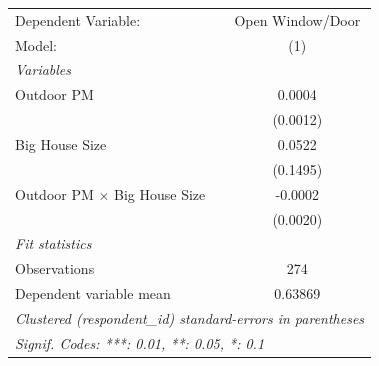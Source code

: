 
\begingroup
\centering
\begin{tabular}{lc}
   \tabularnewline \midrule \midrule
   Dependent Variable:                 & Open Window/Door\\  
   Model:                              & (1)\\  
   \midrule
   \emph{Variables}\\
   Outdoor PM                          & 0.0004\\   
                                       & (0.0012)\\   
   Big House Size                      & 0.0522\\   
                                       & (0.1495)\\   
   Outdoor PM $\times$ Big House Size  & -0.0002\\   
                                       & (0.0020)\\   
   \midrule
   \emph{Fit statistics}\\
   Observations                        & 274\\  
   Dependent variable mean             & 0.63869\\  
   \midrule \midrule
   \multicolumn{2}{l}{\emph{Clustered (respondent\_id) standard-errors in parentheses}}\\
   \multicolumn{2}{l}{\emph{Signif. Codes: ***: 0.01, **: 0.05, *: 0.1}}\\
\end{tabular}
\par\endgroup


